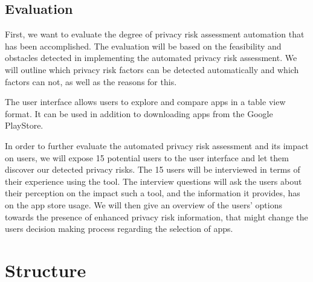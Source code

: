 \documentclass[
	a4paper,
	oneside,
	12pt,
	liststotocnumbered
]{article}
\let\cite\textcite
\begin{document}
\subsection{Evaluation}

First, we want to evaluate the degree of privacy risk assessment automation that has been accomplished. 
The evaluation will be based on the feasibility and obstacles detected in implementing the automated privacy risk assessment. We will outline which privacy risk factors can be detected automatically and which factors can not, as well as the reasons for this.

The \cite{Bruggemann2016} user interface allows users to explore and compare \mH apps in a table view format. 
It can be used in addition to downloading apps from the Google PlayStore.

In order to further evaluate the automated privacy risk assessment and its impact on users, we will expose 15 potential users to the user interface and let them discover our detected privacy risks.
The 15 users will be interviewed in terms of their experience using the \pra tool. 
The interview questions will ask the users about their perception on the impact such a tool, and the information it provides, has on the app store usage.
We will then give an overview of the users' options towards the presence of enhanced privacy risk information, that might change the users decision making process regarding the selection of \mH apps.

\section{Structure}
\end{document}
